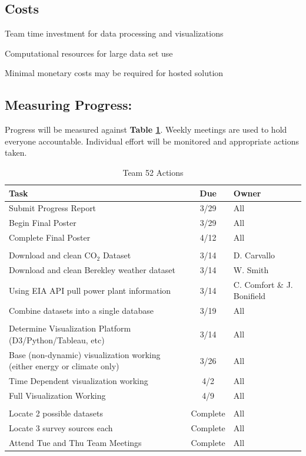 \documentclass[sigconf,nonacm=true]{acmart}
\newenvironment{my_itemize}{
	\begin{itemize}
		\setlength{\itemsep}{1pt}
		\setlength{\parskip}{0pt}
		\setlength{\parsep}{0pt}}
	{\end{itemize}
}
\begin{document}
\subsection{Costs}
\begin{my_itemize}
	\item Team time investment for data processing and visualizations
	\item Computational resources for large data set use
	\item Minimal monetary costs may be required for hosted solution
\end{my_itemize}

\newpage
\subsection{Measuring Progress:}
Progress will be measured against \textbf{Table \ref{table:actions}}. Weekly meetings are used to hold everyone accountable.  Individual effort will be monitored and appropriate actions taken.

\begin{table}[H] 
	\caption{Team 52 Actions}\label{table:actions}
\begin{tabular}{| p{1.75in} | c | >{\centering\arraybackslash}m{0.7in} |}

	\hline 
	\rowcolor{Gray}
	\textbf{Task} & \textbf{Due} & \textbf{Owner} \\ 
	\hline 
	Submit Progress Report & 3/29 & All \\
	\hline
	Begin Final Poster & 3/29 & All \\
	\hline
	Complete Final Poster & 4/12 & All \\
	\hline
	\rowcolor{Gray}
	\multicolumn{3}{|l|}{\textbf{The Data}} \\
	Download and clean CO$_2$ Dataset & 3/14 & D. Carvallo  \\ 
	\hline
	Download and clean Berekley weather dataset & 3/14 & W. Smith \\
	\hline
	Using EIA API pull power plant information & 3/14 & C. Comfort \& J. Bonifield \\
	\hline
	Combine datasets into a single database & 3/19 & All \\
	\hline
	\rowcolor{Gray}
	\multicolumn{3}{|l|}{\textbf{Visualizations}} \\
	Determine Visualization Platform (D3/Python/Tableau, etc) & 3/14 & All \\	
	\hline
	Base (non-dynamic) visualization working (either energy or climate only) & 3/26 & All \\
	\hline 
	Time Dependent visualization working & 4/2 & All \\
	\hline
	Full Visualization Working & 4/9 & All \\
	\hline
	\rowcolor{Gray}
	\multicolumn{3}{|l|}{\textbf{Completed Tasks}} \\
	Locate 2 possible datasets & Complete & All\\
	Locate 3 survey sources each & Complete & All \\
	Attend Tue and Thu Team Meetings & Complete & All\\
	\hline 
\end{tabular} 
\end{table}
\end{document}
